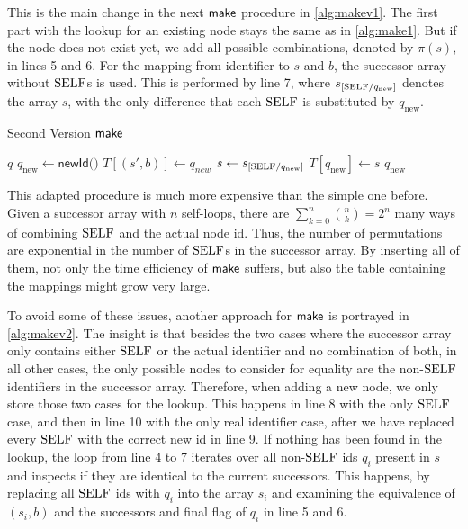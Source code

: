 This is the main change in the next $\operatorname{\textsf{make}}$ procedure in \autoref{alg:makev1}. The first part with the lookup for an existing node stays the same as in \autoref{alg:make1}. But if the node does not exist yet, we add all possible combinations, denoted by $\pi(s)$, in lines 5 and 6. For the mapping from identifier to $s$ and $b$, the successor array without $\mathrm{SELF}$s is used. This is performed by line 7, where $s_{[\mathrm{SELF} / q_{\text{new}}]}$ denotes the array $s$, with the only difference that each $\mathrm{SELF}$ is substituted by $q_{\text{new}}$. 
\par
\begin{algorithm}[htb]
\centering
\caption{Second Version $\operatorname{\textsf{make}}$}\label{alg:makev1}
\begin{algorithmic}[1]
\Return $q$
\Else
\State $q_{\text{new}} \gets \textsf{newId()}$
\State $T[(s',b)] \gets q_{new}$
\EndFor
\State $s \gets s_{[\mathrm{SELF} / q_{\text{new}}]}$
\State $T[q_{\text{new}}] \gets s$
\Return $q_{\text{new}}$
\EndIf
\end{algorithmic}
\end{algorithm}
This adapted procedure is much more expensive than the simple one before. Given a successor array with $n$ self-loops, there are $\sum_{k=0}^{n} \binom{n}{k} = 2^{n}$ many ways of combining $\mathrm{SELF}$ and the actual node id. Thus, the number of permutations are exponential in the number of $\mathrm{SELF}$s in the successor array. By inserting all of them, not only the time efficiency of $\operatorname{\textsf{make}}$ suffers, but also the table containing the mappings might grow very large.
\par
To avoid some of these issues, another approach for $\operatorname{\textsf{make}}$ is portrayed in \autoref{alg:makev2}. 
The insight is that besides the two cases where the successor array only contains either $\mathrm{SELF}$ or the actual identifier and no combination of both, in all other cases, the only possible nodes to consider for equality are the non-$\mathrm{SELF}$ identifiers in the successor array. Therefore, when adding a new node, we only store those two cases for the lookup. This happens in line 8 with the only $\mathrm{SELF}$ case, and then in line 10 with the only real identifier case, after we have replaced every $\mathrm{SELF}$ with the correct new id in line 9.
If nothing has been found in the lookup, the loop from line 4 to 7 iterates over all non-$\mathrm{SELF}$ ids $q_{i}$ present in $s$ and inspects if they are identical to the current successors. This happens, by replacing all $\mathrm{SELF}$ ids with $q_{i}$ into the array $s_{i}$ and examining the equivalence of $(s_{i},b)$ and the successors and final flag of $q_{i}$ in line 5 and 6.


